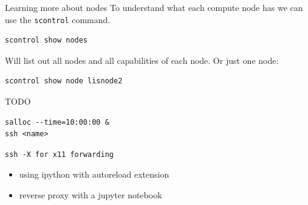\documentclass[10pt]{beamer}
\begin{document}
\begin{frame}[label={sec:orgffa1909},fragile]{Learning more about nodes}
 To understand what each compute node has we can use the \texttt{scontrol} command.

\begin{verbatim}
scontrol show nodes
\end{verbatim}

Will list out all nodes and all capabilities of each node. Or just one node:

\begin{verbatim}
scontrol show node lisnode2
\end{verbatim}
\end{frame}

\begin{frame}[label={sec:org0afcdf1},fragile]{TODO}
 \begin{verbatim}
salloc --time=10:00:00 &
ssh <name>
\end{verbatim}

\begin{verbatim}
ssh -X for x11 forwarding
\end{verbatim}

\begin{itemize}
\item using ipython with autoreload extension
\item reverse proxy with a jupyter notebook
\end{itemize}
\end{frame}
\end{document}
